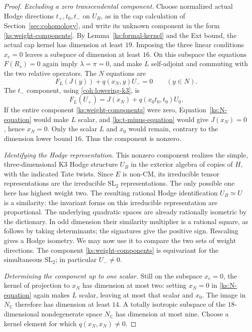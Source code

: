 \documentclass[11pt]{article}
\numberwithin{equation}{section}
\theoremstyle{definition}
\theoremstyle{remark}
\newcommand{\C}{\mathbb C}
\begin{document}
\begin{proof}
\emph{Excluding a zero transcendental component.}
Choose normalized actual Hodge directions $t_+,t_0,t_-$
on $U_B$, as in the cap calculation of
Section~\ref{sec:cohomology}, and write its unknown component
in the form \eqref{ks:weight-components}.
By Lemma~\ref{ks:formal-kernel} and the Ext bound, the actual
cap kernel has dimension at least $19$.  Imposing the three
linear conditions $x_e=0$ leaves a subspace of dimension at
least $16$.  On this subspace the
equations $F(R_s)=0$ again imply $\lambda=\pi=0$, and
make $L$ self-adjoint and commuting with the two relative
operators.  The $N$ equations are
\begin{equation}
 \label{ks:N-equation}
 F_L(J(y))+q(x_N,y)U_-=0\qquad(y\in N).
\end{equation}
The $t_-$ component, using \eqref{coh:lowering-k3}, is
\begin{equation}
 \label{ks:t-minus-equation}
 F_L(U_+)=J(x_N)+q(x_0t_0,t_0)U_0.
\end{equation}
If the entire component \eqref{ks:weight-components} were
zero, Equation~\eqref{ks:N-equation} would make $L$ scalar,
and \eqref{ks:t-minus-equation} would give $J(x_N)=0$,
hence $x_N=0$.
Only the scalar $L$ and $x_0$ would remain, contrary to
the dimension lower bound $16$.  Thus the component is
nonzero.

\emph{Identifying the Hodge representation.}
This nonzero component realizes the simple, three-dimensional
K3 Hodge structure $U_B$ in the exterior algebra of copies of
$H$, with the indicated Tate twists.  Since $E$ is non-CM,
its irreducible tensor representations are the irreducible
$\mathrm{SL}_2$ representations.  The only possible one here
has highest weight two.  The resulting rational Hodge
identification $U_B\simeq U$ is a similarity: the invariant
forms on this irreducible representation are proportional.
The underlying quadratic spaces are already rationally
isometric by the dictionary.  In odd dimension their similarity
multiplier is a rational square, as follows by taking
determinants; the signatures give the positive sign.  Rescaling
gives a Hodge isometry.  We may now use it to compare the two
sets of weight directions.  The component
\eqref{ks:weight-components} is equivariant for the simultaneous
$\mathrm{SL}_2$; in particular $U_-\ne0$.

\emph{Determining the component up to one scalar.}
Still on the subspace $x_e=0$, the kernel of projection
to $x_N$ has dimension at most two: setting $x_N=0$
in \eqref{ks:N-equation} again makes $L$ scalar, leaving
at most that scalar and $x_0$.  The image in $N_{\C}$
therefore has dimension at least $14$.  A totally isotropic
subspace of the $18$-dimensional nondegenerate space
$N_{\C}$ has dimension at most nine.  Choose a kernel
element for which $q(x_N,x_N)\ne0$.


\end{proof}
\end{document}
